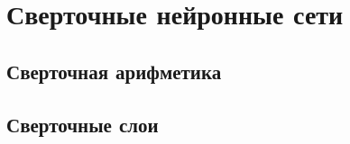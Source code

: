 \section{Сверточные нейронные сети}
	\subsection{Сверточная арифметика}
	\subsection{Сверточные слои}